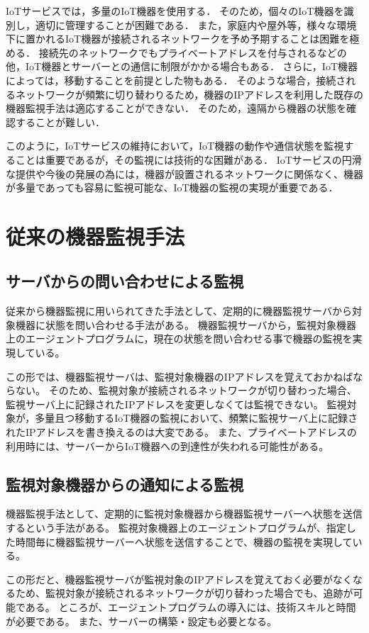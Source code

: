 IoTサービスでは，多量のIoT機器を使用する．
そのため，個々のIoT機器を識別し，適切に管理することが困難である．
また，家庭内や屋外等，様々な環境下に置かれるIoT機器が接続されるネットワークを予め予期することは困難を極める．
接続先のネットワークでもプライベートアドレスを付与されるなどの他，IoT機器とサーバーとの通信に制限がかかる場合もある．
さらに，IoT機器によっては，移動することを前提とした物もある．
そのような場合，接続されるネットワークが頻繁に切り替わりるため，機器のIPアドレスを利用した既存の機器監視手法は適応することができない．
そのため，遠隔から機器の状態を確認することが難しい．
\medskip

このように，IoTサービスの維持において，IoT機器の動作や通信状態を監視することは重要であるが，その監視には技術的な困難がある．
IoTサービスの円滑な提供や今後の発展の為には，機器が設置されるネットワークに関係なく、機器が多量であっても容易に監視可能な、IoT機器の監視の実現が重要である．


\section{従来の機器監視手法}
\subsection{サーバからの問い合わせによる監視}
	従来から機器監視に用いられてきた手法として、定期的に機器監視サーバから対象機器に状態を問い合わせる手法がある。
	機器監視サーバから，監視対象機器上のエージェントプログラムに，現在の状態を問い合わせる事で機器の監視を実現している。
	\medskip

	この形では、機器監視サーバは、監視対象機器のIPアドレスを覚えておかねばならない。
	そのため、監視対象が接続されるネットワークが切り替わった場合、監視サーバ上に記録されたIPアドレスを変更しなくては監視できない。
	監視対象が，多量且つ移動するIoT機器の監視において、頻繁に監視サーバ上に記録されたIPアドレスを書き換えるのは大変である。
	また、プライベートアドレスの利用時には、サーバーからIoT機器への到達性が失われる可能性がある。

\subsection{監視対象機器からの通知による監視}
	機器監視手法として、定期的に監視対象機器から機器監視サーバーへ状態を送信するという手法がある。
	監視対象機器上のエージェントプログラムが、指定した時間毎に機器監視サーバーへ状態を送信することで、機器の監視を実現している。
	\medskip

	この形だと、機器監視サーバが監視対象のIPアドレスを覚えておく必要がなくなるため、監視対象が接続されるネットワークが切り替わった場合でも、追跡が可能である。
	ところが、エージェントプログラムの導入には、技術スキルと時間が必要である。
	また、サーバーの構築・設定も必要となる。


